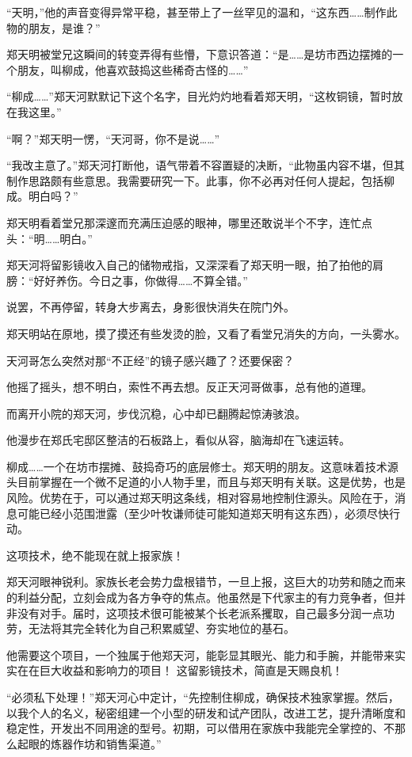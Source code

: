 “天明，”他的声音变得异常平稳，甚至带上了一丝罕见的温和，“这东西……制作此物的朋友，是谁？”

郑天明被堂兄这瞬间的转变弄得有些懵，下意识答道：“是……是坊市西边摆摊的一个朋友，叫柳成，他喜欢鼓捣这些稀奇古怪的……”

“柳成……”郑天河默默记下这个名字，目光灼灼地看着郑天明，“这枚铜镜，暂时放在我这里。”

“啊？”郑天明一愣，“天河哥，你不是说……”

“我改主意了。”郑天河打断他，语气带着不容置疑的决断，“此物虽内容不堪，但其制作思路颇有些意思。我需要研究一下。此事，你不必再对任何人提起，包括柳成。明白吗？”

郑天明看着堂兄那深邃而充满压迫感的眼神，哪里还敢说半个不字，连忙点头：“明……明白。”

郑天河将留影镜收入自己的储物戒指，又深深看了郑天明一眼，拍了拍他的肩膀：“好好养伤。今日之事，你做得……不算全错。”

说罢，不再停留，转身大步离去，身影很快消失在院门外。

郑天明站在原地，摸了摸还有些发烫的脸，又看了看堂兄消失的方向，一头雾水。

天河哥怎么突然对那“不正经”的镜子感兴趣了？还要保密？

他摇了摇头，想不明白，索性不再去想。反正天河哥做事，总有他的道理。

\vspace{2em}

而离开小院的郑天河，步伐沉稳，心中却已翻腾起惊涛骇浪。

他漫步在郑氏宅邸区整洁的石板路上，看似从容，脑海却在飞速运转。

柳成……一个在坊市摆摊、鼓捣奇巧的底层修士。郑天明的朋友。这意味着技术源头目前掌握在一个微不足道的小人物手里，而且与郑天明有关联。这是优势，也是风险。优势在于，可以通过郑天明这条线，相对容易地控制住源头。风险在于，消息可能已经小范围泄露（至少叶牧谦师徒可能知道郑天明有这东西），必须尽快行动。

这项技术，绝不能现在就上报家族！

郑天河眼神锐利。家族长老会势力盘根错节，一旦上报，这巨大的功劳和随之而来的利益分配，立刻会成为各方争夺的焦点。他虽然是下代家主的有力竞争者，但并非没有对手。届时，这项技术很可能被某个长老派系攫取，自己最多分润一点功劳，无法将其完全转化为自己积累威望、夯实地位的基石。

他需要这个项目，一个独属于他郑天河，能彰显其眼光、能力和手腕，并能带来实实在在巨大收益和影响力的项目！ 这留影镜技术，简直是天赐良机！

“必须私下处理！”郑天河心中定计，“先控制住柳成，确保技术独家掌握。然后，以我个人的名义，秘密组建一个小型的研发和试产团队，改进工艺，提升清晰度和稳定性，开发出不同用途的型号。初期，可以借用在家族中我能完全掌控的、不那么起眼的炼器作坊和销售渠道。”

